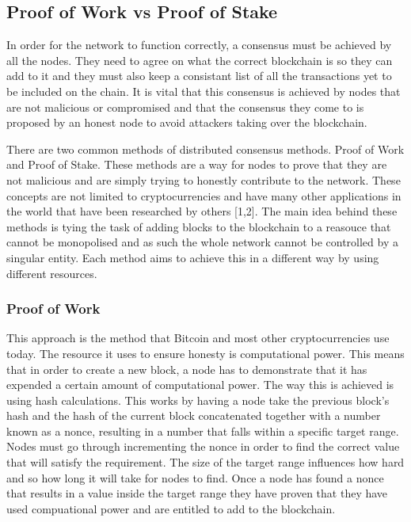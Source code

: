 \documentclass{l4proj}
\begin{document}
\subsection{Proof of Work vs Proof of Stake}
In order for the network to function correctly, a consensus must be achieved by all the nodes. They need to agree
on what the correct blockchain is so they can add to it and they must also keep a consistant list of all the 
transactions yet to be included on the chain. It is vital that this consensus is achieved by nodes that are not
malicious or compromised and that the consensus they come to is proposed by an honest node to avoid attackers
taking over the blockchain. 

There are two common methods of distributed consensus methods. Proof of Work and Proof of Stake. These methods
are a way for nodes to prove that they are not malicious and are simply trying to honestly contribute to the
network. These concepts are not limited to cryptocurrencies and have many other applications in the world that 
have been researched by others [1,2]. The main idea behind these methods is tying the task of adding blocks to the 
blockchain to a reasouce that cannot be monopolised and as such the whole network cannot be controlled by a 
singular entity. Each method aims to achieve this in a different way by using different resources.

\subsubsection{Proof of Work}
This approach is the method that Bitcoin and most other cryptocurrencies use today. The resource it uses to 
ensure honesty is computational power. This means that in order to create a new block, a node has to demonstrate
that it has expended a certain amount of computational power. The way this is achieved is using hash calculations. 
This works by having a node take the previous block's
hash and the hash of the current block concatenated together with a number known as a nonce, resulting in a number
that falls within a specific target range. Nodes must go through incrementing the nonce in order to find the 
correct value that will satisfy the requirement. The size of the target range influences how hard and so how long
it will take for nodes to find. Once a node has found a nonce that results in a value inside the target range
they have proven that they have used compuational power and are entitled to add to the blockchain.
\end{document}
